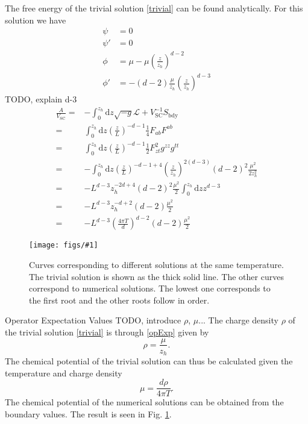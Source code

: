 \documentclass[12pt]{report}
\renewcommand{\d}{\ensuremath{\mathrm{d}}}
\renewcommand{\L}{\ensuremath{\mathcal{L}}}
\newcommand{\fig}[3]{
\begin{figure}
\centering
\texttt{[image: figs/\#1]}
\caption{#2}
\end{figure}
}
\begin{document}
The free energy of the trivial solution \eqref{trivial} can be found analytically. For this solution we have
\begin{equation}
 \begin{split}
  \psi&=0\\
  \psi'&=0\\
  \phi&=\mu-\mu\left(\frac{z}{z_h}\right)^{d-2}\\
  \phi'&=-(d-2)\frac{\mu}{z_h}\left(\frac{z}{z_h}\right)^{d-3}
 \end{split}
\end{equation}TODO, explain d-3
\begin{equation}
\begin{split}
 \frac{A}{V_\mathrm{SC}}=&-\int_0^{z_h}\d z \sqrt{-g}\L+V_\mathrm{SC}^{-1}S_{\mathrm{bdy}}\\
=&\int_0^{z_h}\d z \left(\frac{z}{L}\right)^{-d-1}\frac{1}{4}F_{ab}F^{ab}\\
=&\int_0^{z_h}\d z \left(\frac{z}{L}\right)^{-d-1}\frac{1}{2}F_{zt}^2g^{zz}g^{tt}\\
=&-\int_0^{z_h}\d z \left(\frac{z}{L}\right)^{-d-1+4}\left(\frac{z}{z_h}\right)^{2(d-3)}(d-2)^2\frac{\mu^2}{2z_h^2}\\
=&-L^{d-3}z_h^{-2d+4}(d-2)^2\frac{\mu^2}{2} \int_0^{z_h}\d z z^{d-3}\\
=&-L^{d-3}z_h^{-d+2}(d-2)\frac{\mu^2}{2}\\
=&-L^{d-3}\left(\frac{4\pi T}{d}\right)^{d-2}(d-2)\frac{\mu^2}{2}
\end{split}
\end{equation}
\fig{A}{Curves corresponding to different solutions at the same temperature. The trivial solution is shown as the thick solid line. The other curves correspond to numerical solutions. The lowest one corresponds to the first root and the other roots follow in order.\label{f:mu}}

\section{Operator Expectation Values}
TODO, introduce $\rho$, $\mu$...
The charge density $\rho$ of the trivial solution \eqref{trivial} is through \eqref{opExp} given by
\begin{equation}
 \rho=\frac{\mu}{z_h}.
\end{equation}
The chemical potential of the trivial solution can thus be calculated given the temperature and charge density
\begin{equation}
 \mu=\frac{d\rho}{4\pi T}.
\end{equation}
The chemical potential of the numerical solutions can be obtained from the boundary values. The result is seen in Fig. \ref{f:mu}.
\end{document}

